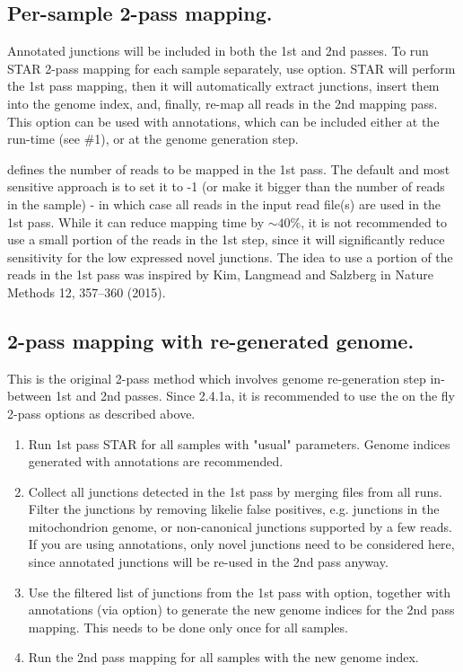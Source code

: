\documentclass[12pt]{article}
\begin{document}
\subsection{Per-sample 2-pass mapping.}
   
Annotated junctions will be included in both the 1st and 2nd passes.
To run STAR 2-pass mapping for each sample separately, use   option. STAR will perform the 1st pass mapping, then it will automatically extract junctions, insert them into the genome index, and, finally, re-map all reads in the 2nd mapping pass. This option can be used with annotations, which can be included either at the run-time (see \#1), or at the genome generation step.

 defines the number of reads to be mapped in the 1st pass. The default and most sensitive approach is to set it to -1 (or make it bigger than the number of reads in the sample) - in which case all reads in the input read file(s) are used in the 1st pass. While it can reduce mapping time by $\sim40\%$, it is not recommended to use a small portion of the reads in the 1st step, since it will significantly reduce sensitivity for the low expressed novel junctions. The idea to use a portion of the reads in the 1st pass was inspired by Kim, Langmead and Salzberg in Nature Methods 12, 357–360 (2015).

\subsection{2-pass mapping with re-generated genome.}
This is the original 2-pass method which involves genome re-generation step in-between 1st and 2nd passes. Since 2.4.1a, it is recommended to use the on the fly 2-pass options as described above.
\begin{enumerate}
\item Run 1st pass STAR for all samples with "usual" parameters. Genome indices generated with annotations are recommended.
\item Collect all junctions detected in the 1st pass by merging  files from all runs. Filter the junctions by removing likelie false positives, e.g. junctions in the mitochondrion genome, or non-canonical junctions supported by a few reads. If you are using annotations, only novel junctions need to be considered here, since annotated junctions will be re-used in the 2nd pass anyway.
\item Use the filtered list of junctions from the 1st pass with  option, together with annotations (via  option) to generate the new genome indices for the 2nd pass mapping. This needs to be done only once for all samples.
\item Run the 2nd pass mapping for all samples with the new genome index.
\end{enumerate}
\end{document}
